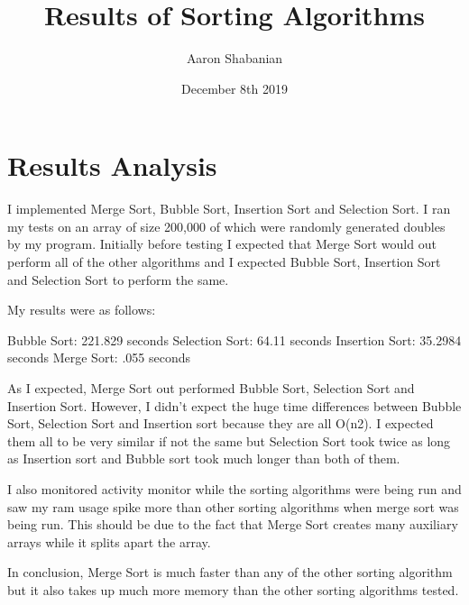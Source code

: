 \documentclass{article}
\title{Results of Sorting Algorithms}
\author{Aaron Shabanian }
\date{December 8th 2019}
\begin{document}
\maketitle
\section{Results Analysis}
	  I implemented Merge Sort, Bubble Sort, Insertion Sort and Selection Sort. I ran my tests on an array of size 200,000 of which were randomly generated doubles by my program.  Initially before testing I expected that Merge Sort would out perform all of the other algorithms and I expected Bubble Sort, Insertion Sort and Selection Sort to perform the same.
      \newline
     \par 	My results were as follows: 
     \newline	\par  \centering Bubble Sort: 221.829 seconds
     \newline                      Selection Sort: 64.11 seconds
      \newline                     Insertion Sort: 35.2984 seconds
      \newline                     Merge Sort: .055 seconds
      \newline 
      \flushleft
       \par
      As I expected, Merge Sort out performed Bubble Sort, Selection Sort and Insertion Sort. However, I didn't expect the huge time differences between Bubble Sort, Selection Sort and Insertion sort because they are all O(n2). I expected them all to be very similar if not the same but Selection Sort took twice as long as Insertion sort and Bubble sort took much longer than both of them. 
      \newline
    \par
      I also monitored activity monitor while the sorting algorithms were being run and saw my ram usage spike more than other sorting algorithms when merge sort was being run. This should be due to the fact that Merge Sort creates many  auxiliary arrays while it splits apart the array.
      \newline
      \par
      In conclusion, Merge Sort is much faster than any of the other sorting algorithm but it also takes up much more memory than the other sorting algorithms tested.
      
\end{document}
